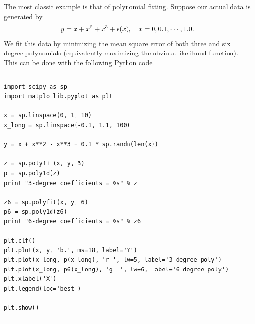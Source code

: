 \begin{example}
The most classic example is that of polynomial fitting.  Suppose our actual data is generated by
\begin{align}
  y = x + x^2 + x^3 + {\epsilon}(x), \quad x=0, 0.1,\cdots,1.0.
  \label{linear:align:poly}
\end{align}
We fit this data by minimizing the mean square error of both three and six degree polynomials (equivalently maximizing the obvious likelihood function).  This can be done with the following Python code.

\rule{\textwidth}{2pt}
\begin{verbatim}
import scipy as sp
import matplotlib.pyplot as plt 

x = sp.linspace(0, 1, 10) 
x_long = sp.linspace(-0.1, 1.1, 100)

y = x + x**2 - x**3 + 0.1 * sp.randn(len(x))

z = sp.polyfit(x, y, 3)
p = sp.poly1d(z)
print "3-degree coefficients = %s" % z 

z6 = sp.polyfit(x, y, 6)
p6 = sp.poly1d(z6)
print "6-degree coefficients = %s" % z6

plt.clf()
plt.plot(x, y, 'b.', ms=18, label='Y')
plt.plot(x_long, p(x_long), 'r-', lw=5, label='3-degree poly')
plt.plot(x_long, p6(x_long), 'g--', lw=6, label='6-degree poly')
plt.xlabel('X')
plt.legend(loc='best')

plt.show()
\end{verbatim}
\rule{\textwidth}{2pt}


\end{example}
